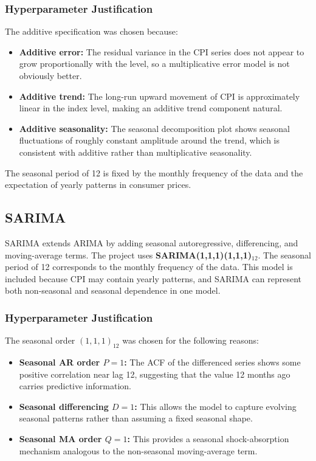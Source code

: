 \subsubsection{Hyperparameter Justification}

The additive specification was chosen because:

\begin{itemize}
	\item \textbf{Additive error:} The residual variance in the CPI series does not appear to grow proportionally with the level, so a multiplicative error model is not obviously better.
	\item \textbf{Additive trend:} The long-run upward movement of CPI is approximately linear in the index level, making an additive trend component natural.
	\item \textbf{Additive seasonality:} The seasonal decomposition plot shows seasonal fluctuations of roughly constant amplitude around the trend, which is consistent with additive rather than multiplicative seasonality.
\end{itemize}

The seasonal period of 12 is fixed by the monthly frequency of the data and the expectation of yearly patterns in consumer prices.

\subsection{SARIMA}

SARIMA extends ARIMA by adding seasonal autoregressive, differencing, and moving-average terms. The project uses \textbf{SARIMA(1,1,1)(1,1,1)$_{12}$}. The seasonal period of 12 corresponds to the monthly frequency of the data. This model is included because CPI may contain yearly patterns, and SARIMA can represent both non-seasonal and seasonal dependence in one model.

\subsubsection{Hyperparameter Justification}

The seasonal order $(1,1,1)_{12}$ was chosen for the following reasons:

\begin{itemize}
	\item \textbf{Seasonal AR order $P=1$:} The ACF of the differenced series shows some positive correlation near lag 12, suggesting that the value 12 months ago carries predictive information.
	\item \textbf{Seasonal differencing $D=1$:} This allows the model to capture evolving seasonal patterns rather than assuming a fixed seasonal shape.
	\item \textbf{Seasonal MA order $Q=1$:} This provides a seasonal shock-absorption mechanism analogous to the non-seasonal moving-average term.
\end{itemize}

